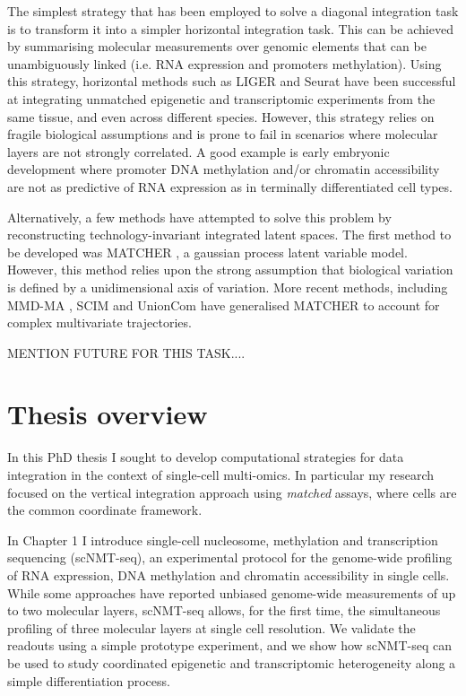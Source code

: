 The simplest strategy that has been employed to solve a diagonal integration task is to transform it into a simpler horizontal integration task. This can be achieved by summarising molecular measurements over genomic elements that can be unambiguously linked (i.e. RNA expression and promoters methylation). Using this strategy, horizontal methods such as LIGER \cite{Welch2019} and Seurat \cite{Stuart2019b} have been successful at integrating unmatched epigenetic and transcriptomic experiments from the same tissue, and even across different species. However, this strategy relies on fragile biological assumptions and is prone to fail in scenarios where molecular layers are not strongly correlated. A good example is early embryonic development where promoter DNA methylation and/or chromatin accessibility are not as predictive of RNA expression \cite{Argelaguet2019} as in terminally differentiated cell types. 

Alternatively, a few methods have attempted to solve this problem by reconstructing technology-invariant integrated latent spaces. The first method to be developed was MATCHER \cite{Welch2017}, a gaussian process latent variable model. However, this method relies upon the strong assumption that biological variation is defined by a unidimensional axis of variation. More recent methods, including MMD-MA \cite{Liu2019}, SCIM \cite{Stark2020} and UnionCom \cite{Cao2020} have generalised MATCHER to account for complex multivariate trajectories.

MENTION FUTURE FOR THIS TASK....


\section{Thesis overview}

In this PhD thesis I sought to develop computational strategies for data integration in the context of single-cell multi-omics. In particular my research focused on the vertical integration approach using \textit{matched} assays, where cells are the common coordinate framework.

In Chapter 1 I introduce single-cell nucleosome, methylation and transcription sequencing (scNMT-seq), an experimental protocol for the genome-wide profiling of RNA expression, DNA methylation and chromatin accessibility in single cells. While some approaches have reported unbiased genome-wide measurements of up to two molecular layers, scNMT-seq allows, for the first time, the simultaneous profiling of three molecular layers at single cell resolution. We validate the readouts using a simple prototype experiment, and we show how scNMT-seq can be used to study coordinated epigenetic and transcriptomic heterogeneity along a simple differentiation process.


